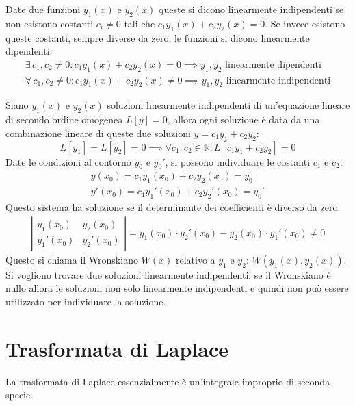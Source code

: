 \documentclass{article}
\numberwithin{equation}{subsection}
\begin{document}
Date due funzioni $y_1(x)$ e $y_2(x)$ queste si dicono linearmente indipendenti se non esistono costanti $c_i\neq0$ tali che $c_1y_1(x)+c_2y_2(x)=0$. Se invece esistono queste costanti, sempre diverse da zero, le funzioni si dicono linearmente dipendenti:
\begin{gather}
    \exists\,c_1,c_2\neq0:c_1y_1(x)+c_2y_2(x)=0\implies y_1,y_2\mbox{ linearmente dipendenti}\\
    \forall\,c_1,c_2\neq0:c_1y_1(x)+c_2y_2(x)\neq0\implies y_1,y_2\mbox{ linearmente indipendenti}
\end{gather}


Siano $y_1(x)$ e $y_2(x)$ soluzioni linearmente indipendenti di un'equazione lineare di secondo ordine omogenea $L[y]=0$, allora ogni soluzione è data da una combinazione lineare di queste due soluzioni $y=c_1y_1+c_2y_2$:
\begin{equation}
    L[y_1]=L[y_2]=0\implies \forall c_1,c_2\in\mathbb{R}:L[c_1y_1+c_2y_2]=0
\end{equation}
Date le condizioni al contorno $y_0$ e $y_0'$, si possono individuare le costanti $c_1$ e $c_2$:
\begin{gather*}
    y(x_0)=c_1y_1(x_0)+c_2y_2(x_0)=y_0\\
    y'(x_0)=c_1y_1'(x_0)+c_2y_2'(x_0)=y_0'
\end{gather*}
Questo sistema ha soluzione se il determinante dei coefficienti è diverso da zero:
\begin{gather*}
    \left|\begin{matrix}
        y_1(x_0) & y_2(x_0)\\
        y_1'(x_0) & y_2'(x_0)
    \end{matrix}\right|=y_1(x_0)\cdot y_2'(x_0)-y_2(x_0)\cdot y_1'(x_0)\neq0
\end{gather*}
Questo si chiama il Wronskiano $W(x)$ relativo a $y_1$ e $y_2$: $W(y_1(x),y_2(x))$.  
Si vogliono trovare due soluzioni linearmente indipendenti; se il Wronskiano è nullo allora le soluzioni non solo linearmente indipendenti e quindi non può essere utilizzato per individuare la soluzione. 

\clearpage

\section{Trasformata di Laplace}

La trasformata di Laplace essenzialmente è un'integrale improprio di seconda specie. 
\end{document}

